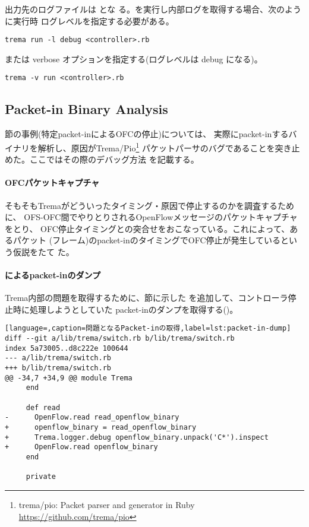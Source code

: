 出力先のログファイルは  とな
る。を実行し内部ログを取得する場合、次のように実行時
ログレベルを指定する必要がある。
\begin{lstlisting}[title=Trema実行時ログレベル指定(\code{-l}: log level option)]
trema run -l debug <controller>.rb
\end{lstlisting}
または verbose オプションを指定する(ログレベルは debug になる)。
\begin{lstlisting}[title=Trema実行時ログレベル指定(\code{-v}: verbose option)]
trema -v run <controller>.rb
\end{lstlisting}

  \subsection{Packet-in Binary Analysis}
  \label{sec:trema-packet-in-analysis}

\label{sec:trema-logger}節の事例(特定packet-inによるOFCの停止)については、
実際にpacket-inするバイナリを解析し、原因がTrema/Pio\footnote{trema/pio:
Packet parser and generator in Ruby \url{https://github.com/trema/pio}}
パケットパーサのバグであることを突き止めた。ここではその際のデバッグ方法
を記載する。

    \paragraph{OFCパケットキャプチャ}
そもそもTremaがどういったタイミング・原因で停止するのかを調査するために、
OFS-OFC間でやりとりされるOpenFlowメッセージのパケットキャプチャをとり、
OFC停止タイミングとの突合せをおこなっている。これによって、あるパケット
(フレーム)のpacket-inのタイミングでOFC停止が発生しているという仮説をたて
た。

    \paragraph{によるpacket-inのダンプ}
Trema内部の問題を取得するために、\label{sec:trema-logger}節に示した
を追加して、コントローラ停止時に処理しようとしていた
packet-inのダンプを取得する()。
\begin{lstlisting}[language=,caption=問題となるPacket-inの取得,label=lst:packet-in-dump]
diff --git a/lib/trema/switch.rb b/lib/trema/switch.rb
index 5a73005..d8c222e 100644
--- a/lib/trema/switch.rb
+++ b/lib/trema/switch.rb
@@ -34,7 +34,9 @@ module Trema
     end

     def read
-      OpenFlow.read read_openflow_binary
+      openflow_binary = read_openflow_binary
+      Trema.logger.debug openflow_binary.unpack('C*').inspect
+      OpenFlow.read openflow_binary
     end

     private
\end{lstlisting}

